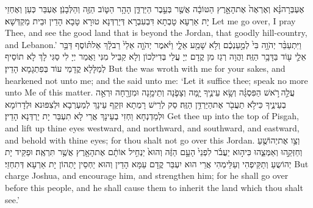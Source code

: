 {אֶעְבְּרָה\maqqaf נָּ֗א וְאֶרְאֶה֙ אֶת\maqqaf הָאָ֣רֶץ הַטּוֹבָ֔ה אֲשֶׁ֖ר בְּעֵ֣בֶר הַיַּרְדֵּ֑ן הָהָ֥ר הַטּ֛וֹב הַזֶּ֖ה וְהַלְּבָנֹֽן׃}
{אֶעְבַּר כְּעַן וְאֶחְזֵי יָת אַרְעָא טָבְתָא דִּבְעִבְרָא דְּיַרְדְּנָא טוּרָא טָבָא הָדֵין וּבֵית מַקְדְּשָׁא׃}
{Let me go over, I pray Thee, and see the good land that is beyond the Jordan, that goodly hill-country, and Lebanon.’}{}
{וַיִּתְעַבֵּ֨ר יְהֹוָ֥ה בִּי֙ לְמַ֣עַנְכֶ֔ם וְלֹ֥א שָׁמַ֖ע אֵלָ֑י וַיֹּ֨אמֶר יְהֹוָ֤ה אֵלַי֙ רַב\maqqaf לָ֔ךְ אַל\maqqaf תּ֗וֹסֶף דַּבֵּ֥ר אֵלַ֛י ע֖וֹד בַּדָּבָ֥ר הַזֶּֽה׃}
{וַהֲוָה רְגַז מִן קֳדָם יְיָ עֲלַי בְּדִילְכוֹן וְלָא קַבֵּיל מִנִּי וַאֲמַר יְיָ לִי סַגִּי לָךְ לָא תוֹסֵיף לְמַלָּלָא קֳדָמַי עוֹד בְּפִתְגָמָא הָדֵין׃}
{But the \lord\space was wroth with me for your sakes, and hearkened not unto me; and the \lord\space said unto me: ‘Let it suffice thee; speak no more unto Me of this matter.}{}
{עֲלֵ֣ה \legarmeh  רֹ֣אשׁ הַפִּסְגָּ֗ה וְשָׂ֥א עֵינֶ֛יךָ יָ֧מָּה וְצָפֹ֛נָה וְתֵימָ֥נָה וּמִזְרָ֖חָה וּרְאֵ֣ה בְעֵינֶ֑יךָ כִּי\maqqaf לֹ֥א תַעֲבֹ֖ר אֶת\maqqaf הַיַּרְדֵּ֥ן הַזֶּֽה׃}
{סַק לְרֵישׁ רָמְתָא וּזְקַף עֵינָךְ לְמַעְרְבָא וּלְצִפּוּנא וּלְדָרוֹמָא וּלְמַדְנְחָא וַחְזִי בְעֵינָךְ אֲרֵי לָא תִעְבַּר יָת יַרְדְּנָא הָדֵין׃}
{Get thee up into the top of Pisgah, and lift up thine eyes westward, and northward, and southward, and eastward, and behold with thine eyes; for thou shalt not go over this Jordan.}{}
{וְצַ֥ו אֶת\maqqaf יְהוֹשֻׁ֖עַ וְחַזְּקֵ֣הוּ וְאַמְּצֵ֑הוּ כִּי\maqqaf ה֣וּא יַעֲבֹ֗ר לִפְנֵי֙ הָעָ֣ם הַזֶּ֔ה וְהוּא֙ יַנְחִ֣יל אוֹתָ֔ם אֶת\maqqaf הָאָ֖רֶץ אֲשֶׁ֥ר תִּרְאֶֽה׃}
{וּפַקֵּיד יָת יְהוֹשֻעַ וְתַקֵּיפְהִי וְעַלֵּימְהִי אֲרֵי הוּא יִעְבַּר קֳדָם עַמָּא הָדֵין וְהוּא יַחְסֵין יָתְהוֹן יָת אַרְעָא דְּתִחְזֵי׃}
{But charge Joshua, and encourage him, and strengthen him; for he shall go over before this people, and he shall cause them to inherit the land which thou shalt see.’}{}
